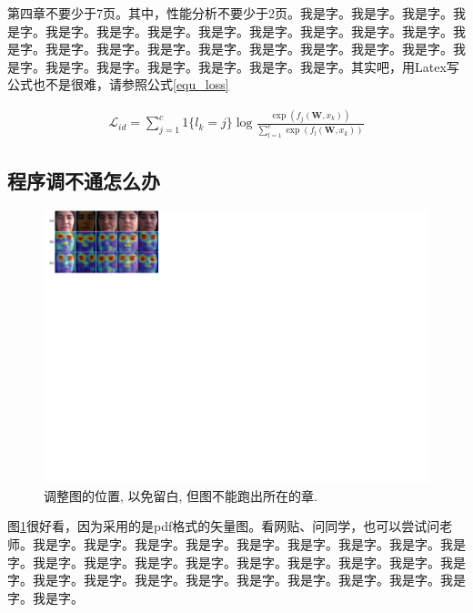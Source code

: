 \documentclass[supercite]{Experimental_Report}
\theoremstyle{definition}
\begin{document}
第四章不要少于7页\cite{Multiplexing2000USA}。其中，性能分析不要少于2页。我是字。我是字。我是字。我是字。我是字。我是字。我是字。我是字。我是字。我是字。我是字。我是字。我是字。我是字。我是字。我是字。我是字。我是字。我是字。我是字。我是字。我是字。我是字。我是字。我是字。我是字。我是字。我是字。其实吧，用Latex写公式也不是很难，请参照公式\ref{equ_loss}

\begin{eqnarray}\label{equ_loss}
	\mathcal{L}_{id}=\sum_{j=1}^{c}1\{l_k=j\}\log\frac{\exp(f_j(\textbf{W},x_k))}{\sum\nolimits_{l=1}^{c}\exp(f_l(\textbf{W},x_k))}
\end{eqnarray}

\subsection{程序调不通怎么办}

\begin{figure}[htb]
	\setlength{\abovecaptionskip}{ 0.0cm}
	\setlength{\belowcaptionskip}{-0.5cm}
	\begin{center}
		\includegraphics[scale=0.65]{Fig4-1.pdf}
		\caption{调整图的位置, 以免留白, 但图不能跑出所在的章.}
		\label{fig4-1}
	\end{center}
\end{figure}

图\ref{fig4-1}很好看，因为采用的是pdf格式的矢量图。看网贴、问同学，也可以尝试问老师\cite{Euro2015WG}。我是字。我是字。我是字。我是字。我是字。我是字。我是字。我是字。我是字。我是字。我是字。我是字。我是字。我是字。我是字。我是字。我是字。我是字。我是字。我是字。我是字。我是字。我是字。我是字。我是字。我是字。我是字。我是字。
\end{document}
